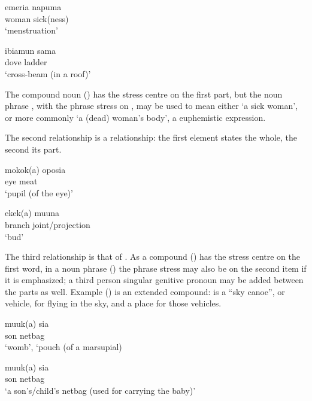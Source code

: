\ea%
\label{ex:x40}
\gll emeria napuma \\
woman sick(ness)\\
\glt`menstruation'
\z

\ea%
\label{ex:x41}
\gll ibiamun sama \\
dove ladder\\
\glt`cross-beam (in a roof)'
\z

The compound noun () has the stress centre on the first part, but the noun phrase , with the phrase stress on , may be used to mean either `a sick woman', or more commonly `a (dead) woman's body', a euphemistic expression. 

The second relationship is a  relationship: the first element states the whole, the second its part.

\ea%
\label{ex:x42}
\gll mokok(a) oposia \\
eye meat\\
\glt`pupil (of the eye)'
\z

\ea%
\label{ex:x43}
\gll ekek(a) muuna \\
branch joint/projection\\
\glt`bud'
\z

The third relationship is that of . As a compound  () has the stress centre on the first word, in a noun phrase () the phrase stress may also be on the second item if it is emphasized; a third person singular genitive pronoun may be added between the parts as well. Example () is an extended compound:  is a ``sky canoe'', or vehicle, for flying in the sky, and  a place for those vehicles.

\ea%
\label{ex:x45}
\gll muuk(a) sia \\
son netbag\\
\glt`womb', `pouch (of a marsupial) 
\z 
{}

\ea%
\label{ex:x1770}
\gll muuk(a) sia \\
son netbag\\
\glt`a son's/child's netbag (used for carrying the baby)'
\z

